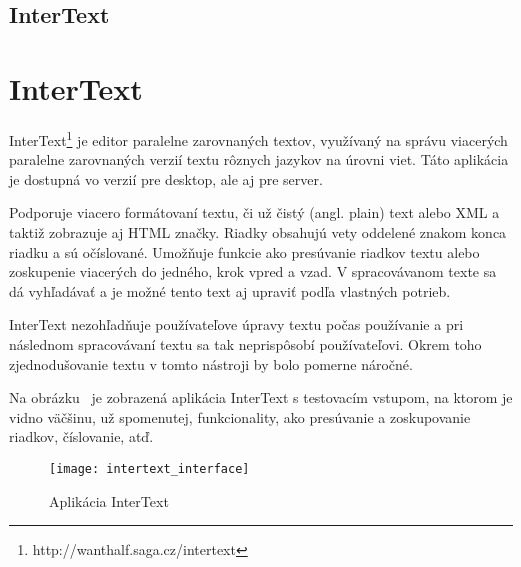 %
%
{
	\subsection{InterText}
}
{
	\section{InterText}
}
InterText\footnote{http://wanthalf.saga.cz/intertext} je editor paralelne zarovnaných textov, využívaný na správu viacerých paralelne zarovnaných verzií textu rôznych jazykov na úrovni viet. Táto aplikácia je dostupná vo verzií pre desktop, ale aj pre server.

Podporuje viacero formátovaní textu, či už čistý (angl. plain) text alebo XML a taktiž zobrazuje aj HTML značky. Riadky obsahujú vety oddelené znakom konca riadku a sú očíslované. Umožňuje funkcie ako presúvanie riadkov textu alebo zoskupenie viacerých do jedného, krok vpred a vzad. V spracovávanom texte sa dá vyhľadávať a je možné tento text aj upraviť podľa vlastných potrieb.

InterText nezohľadňuje používateľove úpravy textu počas používanie a pri následnom spracovávaní textu sa tak neprispôsobí používateľovi. Okrem toho zjednodušovanie textu v tomto nástroji by bolo pomerne náročné.

Na obrázku~ je zobrazená aplikácia InterText s testovacím vstupom, na ktorom je vidno väčšinu, už spomenutej, funkcionality, ako presúvanie a zoskupovanie riadkov, číslovanie, atď.

\begin{figure}[H]
	\begin{center}\texttt{[image: intertext\_interface]}\end{center}
	\caption[Aplikácia InterText]{Aplikácia InterText}\label{fig:intertext_interface}
\end{figure}

